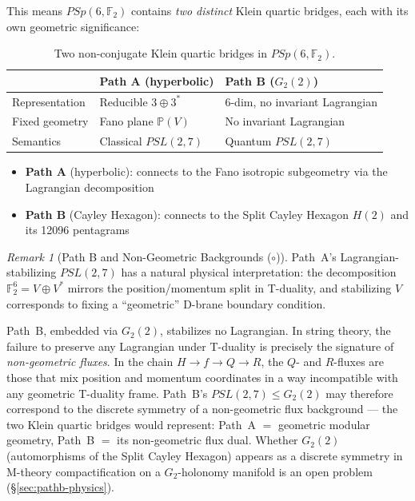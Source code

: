 \documentclass[11pt,a4paper]{article}
\theoremstyle{remark}
\newtheorem{remark}[theorem]{Remark}
\newcommand{\F}{\mathbb{F}}
\begin{document}
This means $PSp(6, \F_2)$ contains \emph{two distinct} Klein quartic
bridges, each with its own geometric significance:

\begin{table}[h]
\centering
\begin{tabular}{l l l}
\toprule
& Path A (hyperbolic) & Path B ($G_2(2)$) \\
\midrule
Representation & Reducible $3 \oplus 3^*$ & 6-dim, no invariant Lagrangian \\
Fixed geometry & Fano plane $\mathbb{P}(V)$ & No invariant Lagrangian \\
Semantics & Classical $PSL(2,7)$ & Quantum $PSL(2,7)$ \\
\bottomrule
\end{tabular}
\caption{Two non-conjugate Klein quartic bridges in $PSp(6, \F_2)$.}
\label{tab:two-paths}
\end{table}

\begin{itemize}
  \item \textbf{Path A} (hyperbolic): connects to the Fano isotropic
    subgeometry via the Lagrangian decomposition
  \item \textbf{Path B} (Cayley Hexagon): connects to the Split Cayley
    Hexagon $H(2)$ and its 12096 pentagrams
\end{itemize}

\begin{remark}[Path B and Non-Geometric Backgrounds ($\circ$)]
\label{rem:pathb-physics}
Path~A's Lagrangian-stabilizing $PSL(2,7)$ has a natural physical
interpretation: the decomposition $\F_2^6 = V \oplus V^*$ mirrors the
position/momentum split in T-duality, and stabilizing $V$ corresponds
to fixing a ``geometric'' D-brane boundary condition.

Path~B, embedded via $G_2(2)$, stabilizes no Lagrangian. In string
theory, the failure to preserve any Lagrangian under T-duality is
precisely the signature of \emph{non-geometric fluxes}. In the chain
$H \to f \to Q \to R$, the $Q$- and $R$-fluxes are those that mix
position and momentum coordinates in a way incompatible with any
geometric T-duality frame. Path~B's $PSL(2,7) \leq G_2(2)$ may
therefore correspond to the discrete symmetry of a non-geometric flux
background --- the two Klein quartic bridges would represent:
Path~A $=$ geometric modular geometry, Path~B $=$ its non-geometric
flux dual. Whether $G_2(2)$ (automorphisms of the Split Cayley Hexagon)
appears as a discrete symmetry in M-theory compactification on a
$G_2$-holonomy manifold is an open problem (\S\ref{sec:pathb-physics}).
\end{remark}
\end{document}
